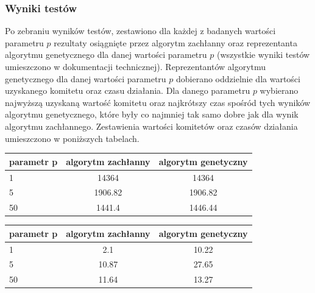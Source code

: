 \documentclass[polish,11pt]{aghthesis}
\begin{document}
\subsubsection{Wyniki testów}
Po zebraniu wyników testów, zestawiono dla każdej z badanych wartości parametru $p$ rezultaty osiągnięte przez algorytm zachłanny oraz reprezentanta algorytmu genetycznego dla danej wartości parametru $p$ (wszystkie wyniki testów umieszczono w dokumentacji technicznej). Reprezentantów algorytmu genetycznego dla danej wartości parametru $p$ dobierano oddzielnie dla wartości uzyskanego komitetu oraz czasu działania. Dla danego parametru $p$ wybierano najwyższą uzyskaną wartość komitetu oraz najkrótszy czas spośród tych wyników algorytmu genetycznego, które były co najmniej tak samo dobre jak dla wynik algorytmu zachłannego. Zestawienia wartości komitetów oraz czasów działania umieszczono w poniższych tabelach. \\
\begin{center}

\begin{tabular}{|l|c|c|}
\hline 
parametr p & algorytm zachłanny & algorytm genetyczny \\ 
\hline 
1 & 14364 & 14364 \\ 
\hline 
5 & 1906.82 & 1906.82 \\ 
\hline 
50 & 1441.4 & 1446.44 \\ 
\hline 
\end{tabular} 
\end{center}

\begin{center}
\begin{tabular}{|l|c|c|}
\hline 
parametr p & algorytm zachłanny & algorytm genetyczny \\ 
\hline 
1 & 2.1 & 10.22 \\ 
\hline 
5 & 10.87 & 27.65 \\ 
\hline 
50 & 11.64 & 13.27 \\ 
\hline 
\end{tabular} 
\end{center}
\end{document}
